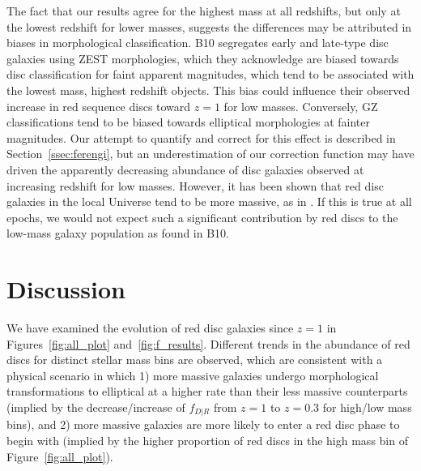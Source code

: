 \documentclass[useAMS,usenatbib]{mn2e}
\begin{document}
The fact that our results agree for the highest mass at all redshifts, but only at the lowest redshift for lower masses, suggests the differences may be attributed in biases in morphological classification. B10 segregates early and late-type disc galaxies using ZEST \citep{Scarlata2007} morphologies, which they acknowledge are biased towards disc classification for faint apparent magnitudes, which tend to be associated with the lowest mass, highest redshift objects. This bias could influence their observed increase in red sequence discs toward $z=1$ for low masses. Conversely, GZ classifications tend to be biased towards elliptical morphologies at fainter magnitudes. Our attempt to quantify and correct for this effect is described in Section~\ref{ssec:ferengi}, but an underestimation of our correction function may have driven the apparently decreasing abundance of disc galaxies observed at increasing redshift for low masses. However, it has been shown that red disc galaxies in the local Universe tend to be more massive, as in \citet{Masters2011}. If this is true at all epochs, we would not expect such a significant contribution by red discs to the low-mass galaxy population as found in B10.

\section{Discussion}
\label{sec:discussion}
We have examined the evolution of red disc galaxies since $z=1$ in Figures~\ref{fig:all_plot} and~\ref{fig:f_results}. Different trends in the abundance of red discs for distinct stellar mass bins are observed, which are consistent with a physical scenario in which 1) more massive galaxies undergo morphological transformations to elliptical at a higher rate than their less massive counterparts (implied by the decrease/increase of $f_{D|R}$ from $z=1$ to $z=0.3$ for high/low mass bins), and 2) more massive galaxies are more likely to enter a red disc phase to begin with (implied by the higher proportion of red discs in the high mass bin of Figure~\ref{fig:all_plot}). 
\end{document}
